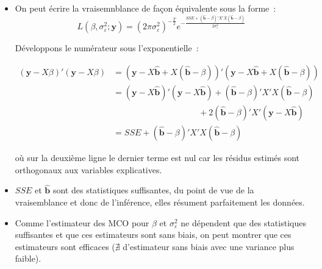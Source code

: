\documentclass[10pt]{beamer}
\begin{document}
\begin{notes}

  \begin{itemize}

  \item On peut écrire la vraisemnblance de façon équivalente sous la forme~:
    \[
      L(\beta, \sigma_{\varepsilon}^2; \mathbf y) = (2\pi\sigma_{\varepsilon}^2)^{-\frac{T}{2}}e^{-\frac{SSE + \left(\hat{\mathbf b}-\beta\right)'X'X\left(\hat{\mathbf b}-\beta\right)}{2\sigma_{\varepsilon}^2}}
    \]

    \medskip

    Développons le numérateur sous l'exponentielle~:

    \begin{align*}
      (\mathbf y - X\beta)'(\mathbf y - X\beta) &= \left(\mathbf y - X\hat{\mathbf b} + X(\hat{\mathbf b}-\beta)\right)'\left(\mathbf y - X\hat{\mathbf b} + X(\hat{\mathbf b}-\beta)\right)\\
                                                &= (\mathbf y - X\hat{\mathbf b})'(\mathbf y - X\hat{\mathbf b})
                                                     + (\hat{\mathbf b}-\beta)'X'X(\hat{\mathbf b}-\beta)\\
                                                & \quad\quad\quad\quad\quad\quad\quad\quad\quad\quad   + 2(\hat{\mathbf b}-\beta)'X'(\mathbf y-X\hat{\mathbf b})\\
                                                   &= SSE + (\hat{\mathbf b}-\beta)'X'X(\hat{\mathbf b}-\beta)
      \end{align*}

    où sur la deuxième ligne le dernier terme est nul car les résidus estimés sont orthogonaux aux variables explicatives.\newline


  \item $SSE$ et $\hat{\mathbf b}$ sont des statistiques suffisantes, du point de vue de la vraisemblance et donc de l'inférence, elles résument parfaitement les données.\newline

  \item Comme l'estimateur des MCO pour $\beta$
    et $\sigma_{\varepsilon}^2$ ne dépendent que des statistiques
    suffisantes et que ces estimateurs sont sans biais, on peut
    montrer que ces estimateurs sont efficaces ($\nexists$
    d'estimateur sans biais avec une variance plus faible).

  \end{itemize}

\end{notes}
\end{document}
